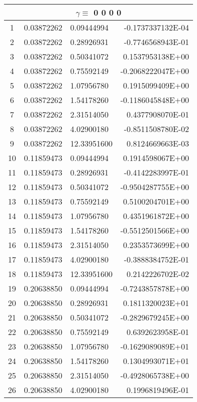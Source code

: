 \begin{longtable}{@{\extracolsep{\fill}}cllr@{}}
\midrule
\multicolumn{4}{c}{ $\gamma \equiv $  0 0 0 0} \\
\midrule
1  &  0.03872262  &  0.09444994  &  -0.1737337132E-04 \\
2  &  0.03872262  &  0.28926931  &  -0.7746568943E-01 \\
3  &  0.03872262  &  0.50341072  &   0.1537953138E+00 \\
4  &  0.03872262  &  0.75592149  &  -0.2068222047E+00 \\
5  &  0.03872262  &  1.07956780  &   0.1915099409E+00 \\
6  &  0.03872262  &  1.54178260  &  -0.1186045848E+00 \\
7  &  0.03872262  &  2.31514050  &   0.4377908070E-01 \\
8  &  0.03872262  &  4.02900180  &  -0.8511508780E-02 \\
9  &  0.03872262  &  12.33951600  &   0.8124669663E-03 \\
10  &  0.11859473  &  0.09444994  &   0.1914598067E+00 \\
11  &  0.11859473  &  0.28926931  &  -0.4142283997E-01 \\
12  &  0.11859473  &  0.50341072  &  -0.9504287755E+00 \\
13  &  0.11859473  &  0.75592149  &   0.5100204701E+00 \\
14  &  0.11859473  &  1.07956780  &   0.4351961872E+00 \\
15  &  0.11859473  &  1.54178260  &  -0.5512501566E+00 \\
16  &  0.11859473  &  2.31514050  &   0.2353573699E+00 \\
17  &  0.11859473  &  4.02900180  &  -0.3888384752E-01 \\
18  &  0.11859473  &  12.33951600  &   0.2142226702E-02 \\
19  &  0.20638850  &  0.09444994  &  -0.7243857878E+00 \\
20  &  0.20638850  &  0.28926931  &   0.1811320023E+01 \\
21  &  0.20638850  &  0.50341072  &  -0.2829679245E+00 \\
22  &  0.20638850  &  0.75592149  &   0.6392623958E-01 \\
23  &  0.20638850  &  1.07956780  &  -0.1629089089E+01 \\
24  &  0.20638850  &  1.54178260  &   0.1304993071E+01 \\
25  &  0.20638850  &  2.31514050  &  -0.4928065738E+00 \\
26  &  0.20638850  &  4.02900180  &   0.1996819496E-01 \\

\end{longtable}
